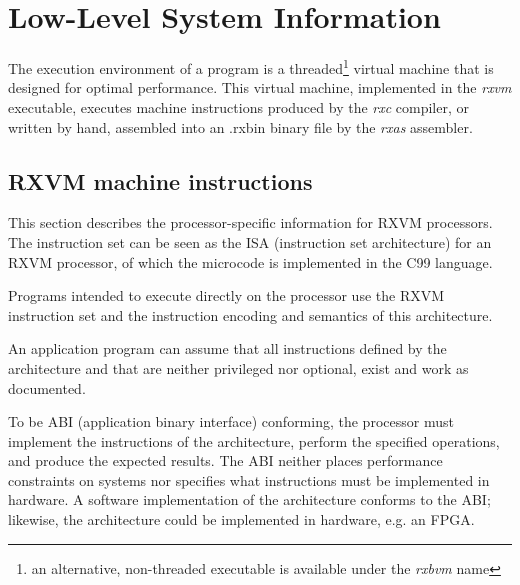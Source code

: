 \chapter{Low-Level System Information}
The execution environment of a \crexx{} program is a
threaded\footnote{an alternative, non-threaded executable is available
  under the \emph{rxbvm} name} virtual
machine that is designed for optimal performance. This virtual
machine, implemented in the \emph{rxvm} executable, executes
machine instructions produced by the \emph{rxc} \crexx{}
compiler, or written by hand, assembled into an .rxbin binary file by
the \emph{rxas} assembler.



\section{RXVM machine instructions}

This section describes the processor-specific information for
RXVM processors. The instruction set can be seen as the ISA
(instruction set architecture) for
an RXVM processor, of which the microcode is implemented in the C99 language.

Programs intended to execute directly on the processor use the
RXVM instruction set and the
instruction encoding and semantics of this architecture.

An application program can assume that all instructions defined by the
architecture and that are neither privileged nor optional, exist and work
as documented.

To be ABI (application binary interface) conforming, the processor must implement the instructions of
the architecture, perform the specified operations, and produce the
expected results.  The ABI neither places performance constraints on
systems nor specifies what instructions must be implemented in
hardware.  A software implementation of the architecture conforms to
the ABI; likewise, the architecture could be implemented in hardware,
e.g. an FPGA.


